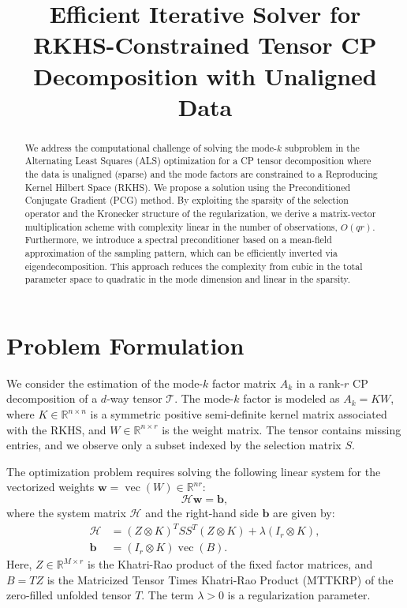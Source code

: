 \documentclass[11pt]{article}
\title{Efficient Iterative Solver for RKHS-Constrained Tensor CP Decomposition with Unaligned Data}
\author{}
\date{}
\newcommand{\R}{\mathbb{R}}
\newcommand{\vecop}{\operatorname{vec}}
\newcommand{\Kron}{\otimes}
\begin{document}
\maketitle

\begin{abstract}
We address the computational challenge of solving the mode-$k$ subproblem in the Alternating Least Squares (ALS) optimization for a CP tensor decomposition where the data is unaligned (sparse) and the mode factors are constrained to a Reproducing Kernel Hilbert Space (RKHS). We propose a solution using the Preconditioned Conjugate Gradient (PCG) method. By exploiting the sparsity of the selection operator and the Kronecker structure of the regularization, we derive a matrix-vector multiplication scheme with complexity linear in the number of observations, $O(qr)$. Furthermore, we introduce a spectral preconditioner based on a mean-field approximation of the sampling pattern, which can be efficiently inverted via eigendecomposition. This approach reduces the complexity from cubic in the total parameter space to quadratic in the mode dimension and linear in the sparsity.
\end{abstract}

\section{Problem Formulation}

We consider the estimation of the mode-$k$ factor matrix $A_k$ in a rank-$r$ CP decomposition of a $d$-way tensor $\mathcal{T}$. The mode-$k$ factor is modeled as $A_k = KW$, where $K \in \R^{n \times n}$ is a symmetric positive semi-definite kernel matrix associated with the RKHS, and $W \in \R^{n \times r}$ is the weight matrix. The tensor contains missing entries, and we observe only a subset indexed by the selection matrix $S$.

The optimization problem requires solving the following linear system for the vectorized weights $\mathbf{w} = \vecop(W) \in \R^{nr}$:
\begin{equation} \label{eq:system}
    \mathcal{H} \mathbf{w} = \mathbf{b},
\end{equation}
where the system matrix $\mathcal{H}$ and the right-hand side $\mathbf{b}$ are given by:
\begin{align}
    \mathcal{H} &= (Z \Kron K)^T S S^T (Z \Kron K) + \lambda (I_r \Kron K), \\
    \mathbf{b} &= (I_r \Kron K) \vecop(B).
\end{align}
Here, $Z \in \R^{M \times r}$ is the Khatri-Rao product of the fixed factor matrices, and $B = T Z$ is the Matricized Tensor Times Khatri-Rao Product (MTTKRP) of the zero-filled unfolded tensor $T$. The term $\lambda > 0$ is a regularization parameter.
\end{document}
